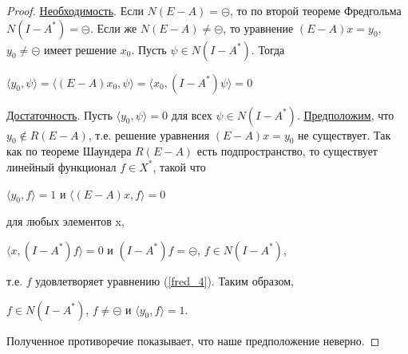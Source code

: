\documentclass[12pt,a4paper,titlepage,oneside]{book}
\theoremstyle{definition}
\theoremstyle{plain}
\theoremstyle{remark}
\theoremstyle{remark}
\theoremstyle{remark}
\theoremstyle{remark}
\theoremstyle{plain}
\theoremstyle{plain}
\begin{document}
\begin{proof}
\underline{Необходимость}. Если $N(E-A)={\circleddash}$, то по второй теореме Фредгольма $N(I-A^*)={\circleddash}$. Если же $N(E-A)\neq {\circleddash}$, то уравнение $(E-A)x=y_0$, $y_0 \neq \circleddash$ имеет решение $x_0$. Пусть $\psi \in N(I-A^*)$. Тогда
\begin{center}
$ \langle y_0,\psi \rangle = \langle (E-A)x_0,\psi \rangle = \langle x_0,(I-A^*)\psi \rangle =0$
\end{center}
\underline{Достаточность}. Пусть $ \langle y_0,\psi \rangle =0$ для всех $\psi \in N(I-A^*)$. \underline{Предположим}, что \\$y_0 \not \in R(E-A)$, т.е. решение уравнения $(E-A)x=y_0$ не существует. Так как по теореме Шаундера $R(E-A)$ есть подпространство, то существует линейный функционал $f\in X^*$, такой что 
\begin{center}
$ \langle y_0,f \rangle =1$ и $ \langle (E-A)x,f \rangle =0$
\end{center}
для любых элементов x,
\begin{center}
$ \langle x,(I-A^*)f \rangle =0$ и $(I-A^*)f=\circleddash$, $f \in N(I-A^*)$,
\end{center}
т.е. $f$ удовлетворяет уравнению (\ref{fred_4}). Таким образом,
\begin{center}
 $f \in N(I-A^*)$, $f\neq \circleddash$ и $ \langle y_0,f \rangle =1$.
\end{center}
Полученное противоречие показывает, что наше предположение неверно.
\end{proof}
\end{document}
